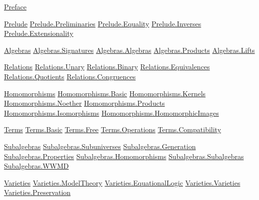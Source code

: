 \href{UALib.Preface.html}{Preface}

\href{UALib.Prelude.html}{Prelude}
\href{UALib.Prelude.Preliminaries.html}{Prelude.Preliminaries}
\href{UALib.Prelude.Equality.html}{Prelude.Equality}
\href{UALib.Prelude.Inverses.html}{Prelude.Inverses}
\href{UALib.Prelude.Extensionality.html}{Prelude.Extensionality}

\href{UALib.Algebras.html}{Algebras}
\href{UALib.Algebras.Signatures.html}{Algebras.Signatures}
\href{UALib.Algebras.Algebras.html}{Algebras.Algebras}
\href{UALib.Algebras.Products.html}{Algebras.Products}
\href{UALib.Algebras.Lifts.html}{Algebras.Lifts}


\href{UALib.Relations.html}{Relations}
\href{UALib.Relations.Unary.html}{Relations.Unary}
\href{UALib.Relations.Binary.html}{Relations.Binary}
\href{UALib.Relations.Equivalences.html}{Relations.Equivalences}
\href{UALib.Relations.Quotients.html}{Relations.Quotients}
\href{UALib.Relations.Congruences.html}{Relations.Congruences}

\href{UALib.Homomorphisms.html}{Homomorphisms}
\href{UALib.Homomorphisms.Basic.html}{Homomorphisms.Basic}
\href{UALib.Homomorphisms.Kernels.html}{Homomorphisms.Kernels}
\href{UALib.Homomorphisms.Noether.html}{Homomorphisms.Noether}
\href{UALib.Homomorphisms.Products.html}{Homomorphisms.Products}
\href{UALib.Homomorphisms.Isomorphisms.html}{Homomorphisms.Isomorphisms}
\href{UALib.Homomorphisms.HomomorphicImages.html}{Homomorphisms.HomomorphicImages}

\href{UALib.Terms.html}{Terms}
\href{UALib.Terms.Basic.html}{Terms.Basic}
\href{UALib.Terms.Free.html}{Terms.Free}
\href{UALib.Terms.Operations.html}{Terms.Operations}
\href{UALib.Terms.Compatibility.html}{Terms.Compatibility}

\href{UALib.Subalgebras.html}{Subalgebras}
\href{UALib.Subalgebras.Subuniverses.html}{Subalgebras.Subuniverses}
\href{UALib.Subalgebras.Generation.html}{Subalgebras.Generation}
\href{UALib.Subalgebras.Properties.html}{Subalgebras.Properties}
\href{UALib.Subalgebras.Homomorphisms.html}{Subalgebras.Homomorphisms}
\href{UALib.Subalgebras.Subalgebras.html}{Subalgebras.Subalgebras}
\href{UALib.Subalgebras.WWMD.html}{Subalgebras.WWMD}

\href{UALib.Varieties.html}{Varieties}
\href{UALib.Varieties.ModelTheory.html}{Varieties.ModelTheory}
\href{UALib.Varieties.EquationalLogic.html}{Varieties.EquationalLogic}
\href{UALib.Varieties.Varieties.html}{Varieties.Varieties}
\href{UALib.Varieties.Preservation.html}{Varieties.Preservation}

